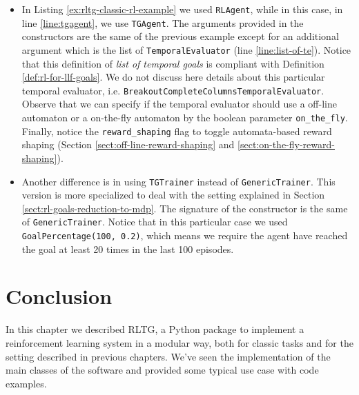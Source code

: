 \begin{itemize}
	\item In Listing \ref{ex:rltg-classic-rl-example} we used \texttt{RLAgent}, while in this case, in line \ref{line:tgagent}, we use \texttt{TGAgent}. The arguments provided in the constructors are the same of the previous example except for an additional argument which is the list of \texttt{TemporalEvaluator} (line \ref{line:list-of-te}). Notice that this definition of \emph{list of temporal goals} is compliant with Definition \ref{def:rl-for-llf-goals}. We do not discuss here details about this particular temporal evaluator, i.e. \texttt{BreakoutCompleteColumnsTemporalEvaluator}. Observe that we can specify if the temporal evaluator should use a off-line automaton or a on-the-fly automaton by the boolean parameter \texttt{on\_the\_fly}. Finally, notice the \texttt{reward\_shaping} flag to toggle automata-based reward shaping (Section \ref{sect:off-line-reward-shaping} and \ref{sect:on-the-fly-reward-shaping}).
	\item Another difference is in using \texttt{TGTrainer} instead of \texttt{GenericTrainer}. This version is more specialized to deal with the setting explained in Section \ref{sect:rl-goals-reduction-to-mdp}. The signature of the constructor is the same of \texttt{GenericTrainer}. Notice that in this particular case we used \texttt{GoalPercentage(100, 0.2)}, which means we require the agent have reached the goal at least 20 times in the last 100 episodes.
\end{itemize}

\section{Conclusion}
In this chapter we described RLTG, a Python package to implement a reinforcement learning system in a modular way, both for classic tasks and for the setting described in previous chapters. We've seen the implementation of the main classes of the software and provided some typical use case with code examples.

